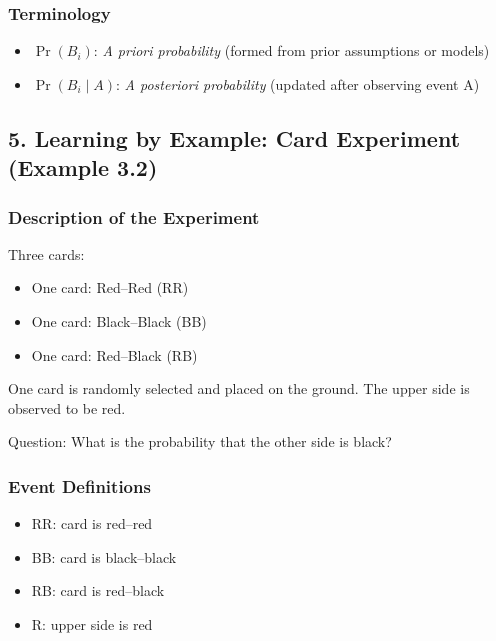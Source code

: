 \documentclass[12pt]{article}
\begin{document}
\subsubsection*{Terminology}

\begin{itemize}
    \item \textbf{$\Pr(B_i)$}: \textit{A priori probability} (formed from prior assumptions or models)
    \item \textbf{$\Pr(B_i \mid A)$}: \textit{A posteriori probability} (updated after observing event A)
\end{itemize}

\hrulefill

\subsection*{5. Learning by Example: Card Experiment (Example 3.2)}

\subsubsection*{Description of the Experiment}

Three cards:

\begin{itemize}
    \item One card: Red--Red (RR)
    \item One card: Black--Black (BB)
    \item One card: Red--Black (RB)
\end{itemize}

One card is randomly selected and placed on the ground. The upper side is observed to be red.

Question: What is the probability that the other side is black?

\hrulefill

\subsubsection*{Event Definitions}

\begin{itemize}
    \item RR: card is red--red
    \item BB: card is black--black
    \item RB: card is red--black
    \item R: upper side is red
\end{itemize}
\end{document}
